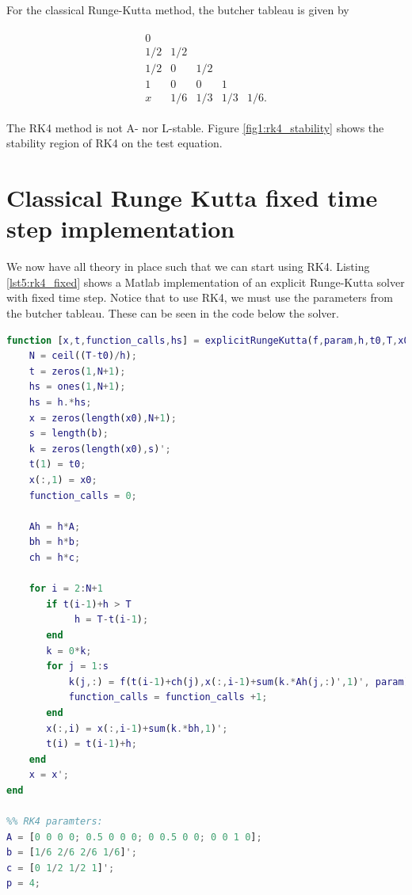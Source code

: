 For the classical Runge-Kutta method, the butcher tableau is given by

\begin{align}
    \begin{array}{c|cccc}
         0   & & & &   \\
         1/2 & 1/2 & & & \\
         1/2 & 0 & 1/2 & & \\
         1   & 0 & 0   & 1 & \\ \hline 
         x   & 1/6 & 1/3 & 1/3 & 1/6.
    \end{array}
\end{align}

The RK4 method is not A- nor L-stable. Figure \ref{fig1:rk4_stability} shows the stability region of RK4 on the test equation. 


\section{Classical Runge Kutta fixed time step implementation}
We now have all theory in place such that we can start using RK4. Listing \ref{lst5:rk4_fixed} shows a Matlab implementation of an explicit Runge-Kutta solver with fixed time step. Notice that to use RK4, we must use the parameters from the butcher tableau. These can be seen in the code below the solver. 

\begin{lstlisting}[language=Matlab,caption=Implementation of explicit Runge-Kutta solver. Parameters corresponding to RK4 given at the end,label=lst5:rk4_fixed]
function [x,t,function_calls,hs] = explicitRungeKutta(f,param,h,t0,T,x0,A,b,c)
    N = ceil((T-t0)/h);
    t = zeros(1,N+1);
    hs = ones(1,N+1);
    hs = h.*hs;
    x = zeros(length(x0),N+1);
    s = length(b);
    k = zeros(length(x0),s)';
    t(1) = t0;
    x(:,1) = x0;
    function_calls = 0;
    
    Ah = h*A;
    bh = h*b;
    ch = h*c;
    
    for i = 2:N+1
       if t(i-1)+h > T
            h = T-t(i-1);
       end
       k = 0*k;
       for j = 1:s
           k(j,:) = f(t(i-1)+ch(j),x(:,i-1)+sum(k.*Ah(j,:)',1)', param);
           function_calls = function_calls +1;
       end
       x(:,i) = x(:,i-1)+sum(k.*bh,1)';
       t(i) = t(i-1)+h;
    end
    x = x';
end

%% RK4 paramters:
A = [0 0 0 0; 0.5 0 0 0; 0 0.5 0 0; 0 0 1 0];
b = [1/6 2/6 2/6 1/6]';
c = [0 1/2 1/2 1]';
p = 4;
\end{lstlisting}


